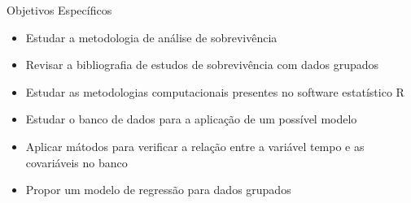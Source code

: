 \documentclass[ignorenonframetext,]{beamer}
\providecommand{\tightlist}{%
  \setlength{\itemsep}{0pt}\setlength{\parskip}{0pt}}
\begin{document}
\begin{frame}{%
\protect\hypertarget{objetivos-especificos}{%
Objetivos Específicos}}

\begin{itemize}
\tightlist
\item
  Estudar a metodologia de análise de sobrevivência
\item
  Revisar a bibliografia de estudos de sobrevivência com dados grupados
\item
  Estudar as metodologias computacionais presentes no software
  estatístico R
\item
  Estudar o banco de dados para a aplicação de um possível modelo
\item
  Aplicar mátodos para verificar a relação entre a variável tempo e as
  covariáveis no banco
\item
  Propor um modelo de regressão para dados grupados
\end{itemize}

\end{frame}
\end{document}

